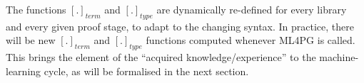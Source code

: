 The functions $[.]_{term}$ and $[.]_{type}$ are dynamically re-defined for every
library and every given proof stage, to adapt to the changing syntax.
In practice, there will be
new $[.]_{term}$ and $[.]_{type}$ functions computed whenever ML4PG is called.
This
brings the element of the ``acquired knowledge/experience'' to the machine-learning cycle, as will be formalised in the next section.
